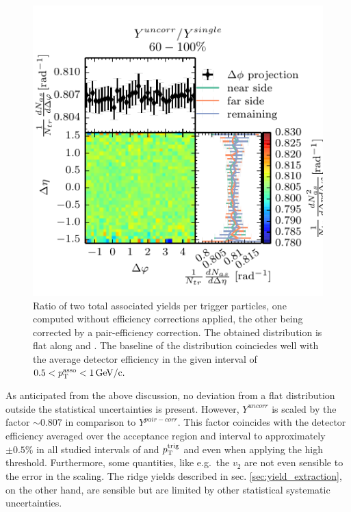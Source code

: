 \begin{figure}
  \centering
  \includegraphics[]{figures/single_track_corr_effect.pdf}
  \caption[Ratio of two total associated yields per trigger particles, one computed without efficiency corrections applied, the other being corrected by a  pair-efficiency correction.]{Ratio of two total associated yields per trigger particles, one computed without efficiency corrections applied, the other being corrected by a  pair-efficiency correction. The obtained distribution is flat along \deta and \dphi. The baseline of the distribution coinciedes well with the average detector efficiency in the given \ptassoc interval of $0.5 < p_{\text{T}}^{\text{asso}} < \SI{1}{GeV/c}.$}
  \label{fig:effect_single_track_correction}
\end{figure}

As anticipated from the above discussion, no deviation from a flat distribution outside the statistical uncertainties is present. However, $Y^{uncorr}$ is scaled by the factor $\sim 0.807$ in comparison to $Y^{pair-corr}$. This factor coincides with the detector efficiency averaged over the acceptance region and \ptassoc interval to approximately $\pm 0.5\%$ in all studied intervals of \ptassoc and $p_{\text{T}}^{\text{trig}}$ and even when applying the high \pt threshold. Furthermore, some quantities, like e.g.\ the $v_2$ are not even sensible to the error in the scaling. The ridge yields described in sec. \ref{sec:yield_extraction}, on the other hand, are sensible but are limited by other statistical systematic uncertainties.\\

